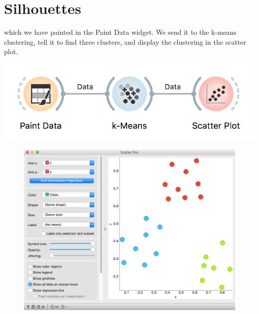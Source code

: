 \chapter{Silhouettes}
\label{ch:silhouettes}

 which we have painted in the Paint Data widget. We send it to the k-means clustering, tell it to find three clusters, and display the clustering in the scatter plot.

\begin{marginfigure}
    \centering
    \includegraphics[width=\linewidth]{paint-and-kmeans.png}
    \caption{$\;$}
\end{marginfigure}

\begin{figure}[h]
    \centering
    \includegraphics[width=\linewidth]{silhouette-from-paint.png}
    \caption{$\;$} %
\end{figure}

